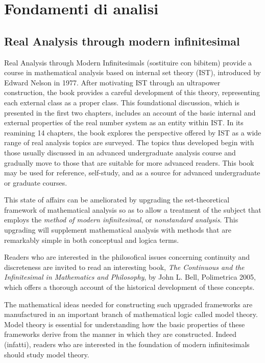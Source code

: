 \section{Fondamenti di analisi}

\subsection{Real Analysis through modern infinitesimal}
Real Analysis through Modern Infinitesimals (sostituire con bibitem) provide a course in mathematical analysis based on internal set theory (IST), introduced by Edward Nelson in 1977. After motivating IST through an ultrapower construction, the book provides a careful development of this theory, representing each external class as a proper class. This foundational discussion, which is presented in the first two chapters, includes an account of the basic internal and external properties of the real number system as an entity within IST. In its reamining 14 chapters, the book explores the perspective offered by IST as a wide range of real analysis topics are surveyed. The topics thus developed begin with those usually discussed in an advanced undergraduate analysis course and gradually move to those that are suitable for more advanced readers. This book may be used for reference, self-study, and as a source for advanced undergraduate or graduate courses.

This state of affairs can be ameliorated by upgrading the set-theoretical framework of mathematical analysis so as to allow a treatment of the subject that employs the \emph{method of modern infinitesimal}, or \emph{nonstandard analysis}. This upgrading will supplement mathematical analysis with methods that are remarkably simple in both conceptual and logica terms.

Readers who are interested in the philosofical issues concerning continuity and discreteness are invited to read an interesting book, \emph{The Continuous and the Infinitesimal in Mathematics and Philosophy}, by John L. Bell, Polimetrica 2005, which offers a thorough account of the historical development of these concepts.

The mathematical ideas needed for constructing such upgraded frameworks are manufactured in an important branch of mathematical logic called model theory. Model theory is essential for understanding how the basic properties of these frameworks derive from the manner in which they are constructed. Indeed (infatti), readers who are interested in the foundation of modern infinitesimals should study model theory.

